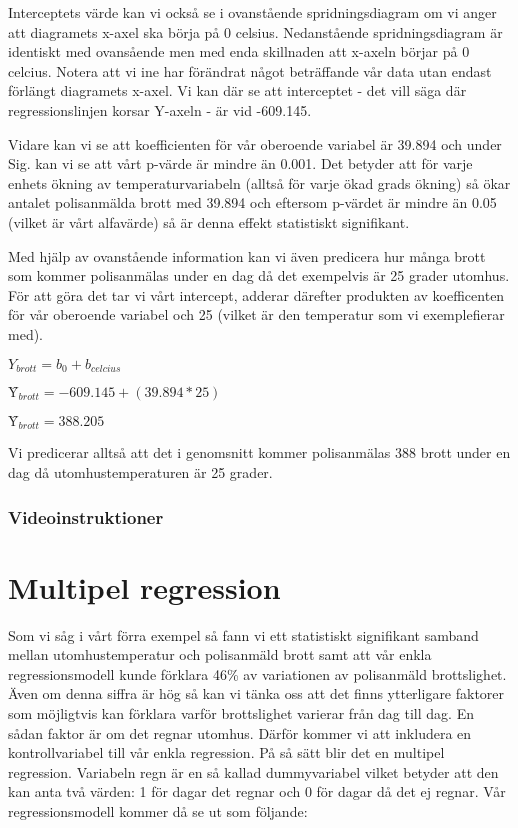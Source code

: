 \documentclass[
]{book}
\begin{document}
Interceptets värde kan vi också se i ovanstående spridningsdiagram om vi anger att diagramets x-axel ska börja på 0 celsius. Nedanstående spridningsdiagram är identiskt med ovansående men med enda skillnaden att x-axeln börjar på 0 celcius. Notera att vi ine har förändrat något beträffande vår data utan endast förlängt diagramets x-axel. Vi kan där se att interceptet - det vill säga där regressionslinjen korsar Y-axeln - är vid -609.145.

Vidare kan vi se att koefficienten för vår oberoende variabel är 39.894 och under Sig. kan vi se att vårt p-värde är mindre än 0.001. Det betyder att för varje enhets ökning av temperaturvariabeln (alltså för varje ökad grads ökning) så ökar antalet polisanmälda brott med 39.894 och eftersom p-värdet är mindre än 0.05 (vilket är vårt alfavärde) så är denna effekt statistiskt signifikant.

Med hjälp av ovanstående information kan vi även predicera hur många brott som kommer polisanmälas under en dag då det exempelvis är 25 grader utomhus. För att göra det tar vi vårt intercept, adderar därefter produkten av koefficenten för vår oberoende variabel och 25 (vilket är den temperatur som vi exemplefierar med).

\(Y_{brott} = b_0 + b_{celcius}\)

\(Ŷ_{brott} = -609.145 + (39.894*25)\)

\(Ŷ_{brott} = 388.205\)

Vi predicerar alltså att det i genomsnitt kommer polisanmälas 388 brott under en dag då utomhustemperaturen är 25 grader.

\hypertarget{videoinstruktioner-10}{%
\subsection{Videoinstruktioner}\label{videoinstruktioner-10}}

\hypertarget{multipel-regression}{%
\chapter{Multipel regression}\label{multipel-regression}}

Som vi såg i vårt förra exempel så fann vi ett statistiskt signifikant samband mellan utomhustemperatur och polisanmäld brott samt att vår enkla regressionsmodell kunde förklara 46\% av variationen av polisanmäld brottslighet. Även om denna siffra är hög så kan vi tänka oss att det finns ytterligare faktorer som möjligtvis kan förklara varför brottslighet varierar från dag till dag. En sådan faktor är om det regnar utomhus. Därför kommer vi att inkludera en kontrollvariabel till vår enkla regression. På så sätt blir det en multipel regression. Variabeln regn är en så kallad dummyvariabel vilket betyder att den kan anta två värden: 1 för dagar det regnar och 0 för dagar då det ej regnar. Vår regressionsmodell kommer då se ut som följande:
\end{document}
